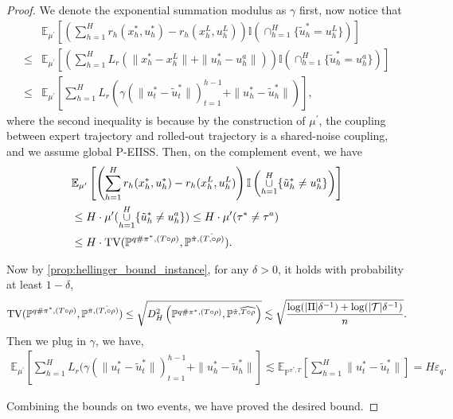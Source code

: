 \documentclass{article}
\begin{document}
\begin{proof}
We denote the exponential summation modulus as $\gamma$ first, now notice that
    \begin{align*}
        &\mathbb E_{\mu^\prime} \left[\left(\sum_{h=1}^H r_h(x_h^*, u_h^*)-r_h(x_h^L,u_h^L) \right)\mathbb I\left(\mathop{\cap}_{h=1}^H\{\tilde u_h^* = u_h^L\} \right)\right] \\
        \leq &\mathbb E_{\mu^\prime} \left[\left(\sum_{h=1}^H L_r(\|x_h^*-x_h^L\|+\|u_h^*-u_h^a\|) \right)\mathbb I\left(\mathop{\cap}_{h=1}^H\{\tilde u_h^* = u_h^a\} \right)\right]\\
        \leq &\mathbb E_{\mu^\prime}\left[\sum_{h=1}^H L_r(\gamma(\|u_t^*-\tilde u_t^*\|)_{t=1}^{h-1}+\|u_h^*-\tilde u_h^*\|)\right],
    \end{align*}
    where the second inequality is because by the construction of $\mu^\prime$, the coupling between expert trajectory and rolled-out trajectory is a shared-noise coupling, and we assume global P-EIISS. Then, on the complement event, we have
    \begin{align*}
        &\mathbb E_{\mu^\prime} \left[\left(\sum_{h=1}^H r_h(x_h^*, u_h^*)-r_h(x_h^L,u_h^L) \right)\mathbb I\left( \mathop{\cup}_{h=1}^H\{\tilde u_h^* \neq u_h^a\}\right)\right]\\
        & \leq H\cdot \mu^\prime(\mathop{\cup}_{h=1}^H\{\tilde u_h^* \neq u_h^a\})\leq H\cdot\mu^\prime(\tau^*\neq \tau^a)\\
        &\leq H\cdot\textnormal{TV}(\mathbb P^{q\#\pi^*, (T\circ \rho)},\mathbb P^{\hat \pi, \hat {(T,\circ \rho)}}).
    \end{align*}

Now by \cref{prop:hellinger_bound_instance}, for any $\delta>0$, it holds with probability at least $1-\delta$,
\begin{equation*}
    \textnormal{TV}(\mathbb P^{q\#\pi^*, (T\circ \rho)},\mathbb P^{\hat \pi, \hat {(T,\circ \rho)}})\leq \sqrt{D_H^2\left(\mathbb P^{q\#\pi^*, (T\circ \rho)},\mathbb P^{\hat \pi, \widehat{T\circ \rho}}\right)}\lesssim \sqrt{\frac{\log(|\Pi|\delta^{-1})+\log(|\mathcal T|\delta^{-1})}{n}}.
\end{equation*}
Then we plug in $\gamma$, we have,
\begin{align*}
    \mathbb E_{\mu^\prime}\left[\sum_{h=1}^H L_r(\gamma(\|u_t^*-\tilde u_t^*\|)_{t=1}^{h-1}+\|u_h^*-\tilde u_h^*\|\right]\lesssim \mathbb E_{\mathbb P^{\pi^*, T}}\left[\sum_{h=1}^H \|u_t^*-\tilde u_t^*\|\right]=H\varepsilon_q.
\end{align*}
    
    Combining the bounds on two events, we have proved the desired bound.
\end{proof}
\end{document}
